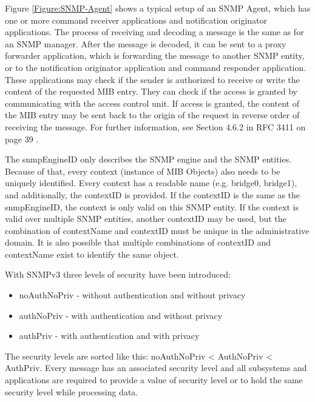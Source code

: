 Figure \ref{Figure:SNMP-Agent} shows a typical setup of an SNMP Agent, which has one or more command receiver applications and notification originator applications. The process of receiving and decoding a message is the same as for an SNMP manager. After the message is decoded, it can be sent to a proxy forwarder application, which is forwarding the message to another SNMP entity, or to the notification originator application and command responder application. These applications may check if the sender is authorized to receive or write the content of the requested MIB entry. They can check if the access is granted by communicating with the access control unit. If access is granted, the content of the MIB entry may be sent back to the origin of the request in reverse order of receiving the message. For further information, see Section 4.6.2 in RFC 3411 on page 39 \cite{RFC:RFC3411:2002}.

The snmpEngineID only describes the SNMP engine and the SNMP entities. Because of that, every context (instance of MIB Objects) also needs to be uniquely identified. Every context has a readable name (e.g. bridge0, bridge1), and additionally, the contextID is provided. If the contextID is the same as the snmpEngineID, the context is only valid on this SNMP entity. If the context is valid over multiple SNMP entities, another contextID may be used, but the combination of contextName and contextID must be unique in the administrative domain. It is also possible that multiple combinations of contextID and contextName exist to identify the same object.

With SNMPv3 three levels of security have been introduced:

\begin{minipage}{\textwidth}
\begin{itemize}
    \item noAuthNoPriv - without authentication and without privacy
    \item authNoPriv - with authentication and without privacy
    \item authPriv - with authentication and with privacy
\end{itemize}
\end{minipage}

\newpage
The security levels are sorted like this: noAuthNoPriv < AuthNoPriv < AuthPriv. Every message has an associated security level and all subsystems and applications are required to provide a value of security level or to hold the same security level while processing data.

